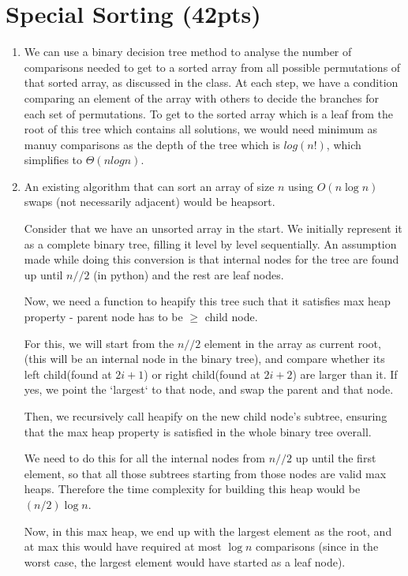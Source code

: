 \documentclass{article}[12pt]
\begin{document}
\section{Special Sorting (42pts) }

\begin{enumerate}
\item
We can use a binary decision tree method to analyse the number of comparisons needed to get to a sorted array from all possible permutations of that sorted array, as discussed in the class. At each step, we have a condition comparing an element of the array with others to decide the branches for each set of permutations. To get to the sorted array which is a leaf from the root of this tree which contains all solutions, we would need minimum as manuy comparisons as the depth of the tree which is $log(n!)$, which simplifies to $\Theta(nlogn)$.

\item 
An existing algorithm that can sort an array of size $n$ using $O(n\log n)$ swaps (not necessarily adjacent) would be heapsort.

Consider that we have an unsorted array in the start. We initially represent it as a complete binary tree, filling it level by level sequentially. An assumption made while doing this conversion is that internal nodes for the tree are found up until $n//2$ (in python) and the rest are leaf nodes.

Now, we need a function to heapify this tree such that it satisfies max heap property  - parent node has to be $\geq$ child node. 

For this, we will start from the $n//2$ element in the array as current root, (this will be an internal node in the binary tree), and compare whether its left child(found at $2i+1$) or right child(found at $2i + 2$) are larger than it. If yes, we point the `largest` to that node, and swap the parent and that node.

Then, we recursively call heapify on the new child node's subtree, ensuring that the max heap property is satisfied in the whole binary tree overall.

We need to do this for all the internal nodes from $n//2$ up until the first element, so that all those subtrees starting from those nodes are valid max heaps. Therefore the time complexity for building this heap would be $(n/2)\log n$.

Now, in this max heap, we end up with the largest element as the root, and at max this would have required at most $\log n$ comparisons (since in the worst case, the largest element would have started as a leaf node).


\end{enumerate}
\end{document}
